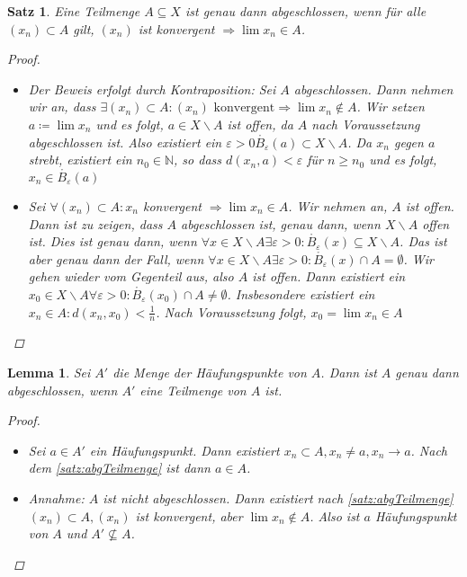 \documentclass[ngerman,titlepage,twoside, parskip=half*]{scrreprt}
\newcommand*{\N}{\mathbb{N}}
\theoremstyle{break}
\newtheorem{lemma}{Lemma}
\newtheorem{theorem}{Satz}[section]
\theoremstyle{nonumberbreak}
\newtheorem{proof}{Beweis:}
\begin{document}
\begin{theorem}\label{satz:abgTeilmenge}
  Eine Teilmenge $A\subseteq X$ ist genau dann abgeschlossen, wenn für
  alle $(x_n) \subset A$ gilt, $(x_n)$ ist konvergent $\Rightarrow
  \lim x_n \in A$.
  \begin{proof}
    \begin{itemize}
     \item["`$\Rightarrow$"'] Der Beweis erfolgt durch Kontraposition: Sei $A$
      abgeschlossen. Dann nehmen wir an, dass $\exists (x_n)\subset
      A\colon(x_n) \text{ konvergent} \Rightarrow \lim x_n \notin A$. Wir
      setzen $a\coloneqq\lim x_n$ und es folgt, $a \in X\backslash A$ ist
      offen, da $A$ nach Voraussetzung abgeschlossen ist. Also existiert ein
      $\varepsilon >0 \mathring{B_{\varepsilon}}(a)\subset X\backslash A$. Da
      $x_n$ gegen $a$ strebt, existiert ein $n_0\in \N$, so dass
      $d(x_n,a)<\varepsilon$ für $n\geq n_0$ und es folgt, $x_n \in
      \mathring{B_{\varepsilon}}(a)$\lightning
     \item["`$\Leftarrow$"'] Sei $\forall (x_n)\subset A\colon x_n$ konvergent
      $\Rightarrow \lim x_n \in A$. Wir nehmen an, $A$ ist offen. Dann ist zu
      zeigen, dass $A$ abgeschlossen ist, genau dann, wenn
      $X\backslash A$  offen ist. Dies ist genau dann, wenn $\forall x
      \in X\backslash A \exists \varepsilon
      >0\colon\mathring{B_{\varepsilon}} (x)\subseteq X\backslash
      A$. Das ist aber genau dann der Fall, wenn $\forall x \in
      X\backslash A \exists \varepsilon
      >0\colon\mathring{B_{\varepsilon}} (x)\cap A = \emptyset$. Wir
      gehen wieder vom Gegenteil aus, also $A$ ist offen. Dann
      existiert ein $x_0 \in X\backslash A \forall \varepsilon
      >0\colon\mathring{B_{\varepsilon}}(x_0) \cap A \neq \emptyset$.
      Insbesondere existiert ein $x_n \in A \colon d(x_n,x_0)<\frac{1}{n}$.
      Nach Voraussetzung folgt, $x_0=\lim x_n \in A$\lightning
    \end{itemize}
  \end{proof}
\end{theorem}

\begin{lemma}
  Sei $A'$ die Menge der Häufungspunkte von $A$. Dann ist $A$ genau dann
  abgeschlossen, wenn $A'$ eine Teilmenge von $A$ ist.
  \begin{proof}
    \begin{itemize}
    \item["`$\Rightarrow$"'] Sei $a\in A'$ ein Häufungspunkt. Dann
      existiert $x_n \subset A, x_n\neq a, x_n\rightarrow a$. Nach dem
      \autoref{satz:abgTeilmenge} ist dann  $a \in A$.
    \item["`$\Leftarrow$"'] Annahme: $A$ ist nicht abgeschlossen. Dann
      existiert nach \autoref{satz:abgTeilmenge} $(x_n) \subset A,
      (x_n)$ ist konvergent, aber $\lim x_n\notin A$. Also ist $a$
      Häufungspunkt von $A$ und $A'\nsubseteq A$.\lightning
\end{itemize}
  \end{proof}
\end{lemma}
\end{document}
